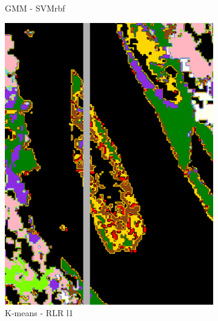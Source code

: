 \documentclass{siamart171218}
\begin{document}
\begin{figure}[h!]
\begin{subfigure}[b]{0.25\textwidth}
                \caption{GMM - SVMrbf}
                \label{fig:GMM_SVMrbf}
        \end{subfigure}%
        \begin{subfigure}[b]{0.25\textwidth}
                \centering
                \includegraphics[width=.80\linewidth]{images/Rejet_peintures_Kmeans_Log_reg_l1_T0.50_Ile.png}
                \caption{K-means - RLR l1}
                \label{fig:Kmeans_LRL1}
        \end{subfigure}%
        \begin{subfigure}[b]{0.25\textwidth}
                \centering

\end{subfigure}
\end{figure}
\end{document}
